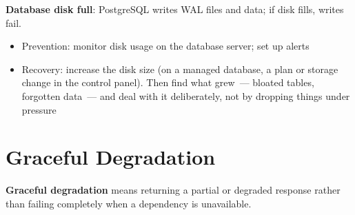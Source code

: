 \begin{codebox}[short]

\begin{Shaded}
\begin{Highlighting}[]
\OperatorTok{{-}}
\OperatorTok{!=}  \OperatorTok{{-}}\OperatorTok{\textgreater{}}  \NormalTok{;}


\end{Highlighting}
\end{Shaded}

\end{codebox}

\noindent{}\textbf{Database disk full}: PostgreSQL writes WAL files and data; if disk fills, writes fail.

\begin{itemize}
\tightlist
\item
  Prevention: monitor disk usage on the database server; set up alerts
\item
  Recovery: increase the disk size (on a managed database, a plan or storage change in the control panel). Then find what grew~--- bloated tables, forgotten data~--- and deal with it deliberately, not by dropping things under pressure
\end{itemize}

\setcounter{section}{2}
\section{Graceful Degradation}\label{37-reliability:373-graceful-degradation}

\textbf{Graceful degradation} means returning a partial or degraded response rather than failing completely when a dependency is unavailable.

